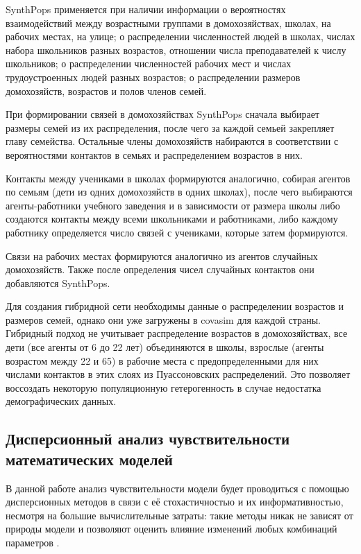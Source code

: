 \documentclass[a4paper,12pt]{article} %
\begin{document}
SynthPops применяется при наличии информации о вероятностях взаимодействий между возрастными группами в домохозяйствах, школах, на рабочих местах, на улице; о распределении численностей людей в школах, числах набора школьников разных возрастов, отношении числа преподавателей к числу школьников; о распределении численностей рабочих мест и числах трудоустроенных людей разных возрастов; о распределении размеров домохозяйств, возрастов и полов членов семей. 

При формировании связей в домохозяйствах SynthPops сначала выбирает размеры семей из их распределения, после чего за каждой семьей закрепляет главу семейства. Остальные члены домохозяйств набираются в соответствии с вероятностями контактов в семьях и распределением возрастов в них.

Контакты между учениками в школах формируются аналогично, собирая агентов по семьям (дети из одних домохозяйств в одних школах), после чего выбираются агенты-работники учебного заведения и в зависимости от размера школы либо создаются контакты между всеми школьниками и работниками, либо каждому работнику определяется число связей с учениками, которые затем формируются.

Связи на рабочих местах формируются аналогично из агентов случайных домохозяйств. Также после определения чисел случайных контактов они добавляются SynthPops.

Для создания гибридной сети необходимы данные о распределении возрастов и размеров семей, однако они уже загружены в \gls{covasim} для каждой страны. Гибридный подход не учитывает распределение возрастов в домохозяйствах, все дети (все агенты от 6 до 22 лет) объединяются в школы, взрослые (агенты возрастом между 22 и 65) в рабочие места с предопределенными для них числами контактов в этих слоях из Пуассоновских распределений. Это позволяет воссоздать некоторую популяционную гетерогенность в случае недостатка демографических данных.



\subsection{Дисперсионный анализ чувствительности математических моделей}

В данной работе анализ чувствительности модели будет проводиться с помощью дисперсионных методов в связи с её стохастичностью и их информативностью, несмотря на большие вычислительные затраты: такие методы никак не зависят от природы модели и позволяют оценить влияние изменений любых комбинаций параметров \cite{saltelli2008global}.
\end{document}
